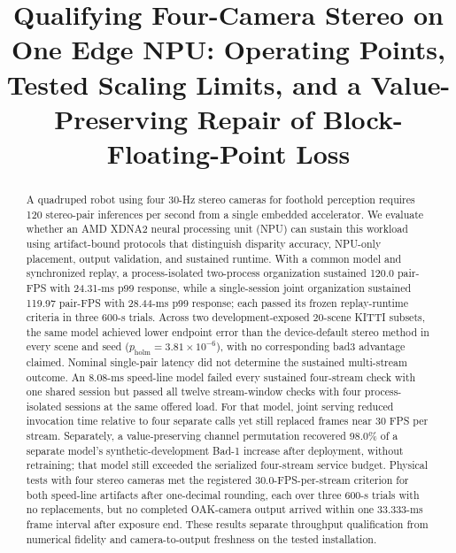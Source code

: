 \documentclass[sigconf,review,anonymous]{acmart}
\begin{document}
\title[Qualifying Four-Camera Stereo on One Edge NPU]{Qualifying Four-Camera Stereo on One Edge NPU: Operating Points, Tested Scaling Limits, and a Value-Preserving Repair of Block-Floating-Point Loss}
\begin{abstract}
A quadruped robot using four 30-Hz stereo cameras for foothold perception requires 120 stereo-pair inferences per second from a single embedded accelerator. We evaluate whether an AMD XDNA2 neural processing unit (NPU) can sustain this workload using artifact-bound protocols that distinguish disparity accuracy, NPU-only placement, output validation, and sustained runtime.
With a common model and synchronized replay, a process-isolated two-process organization sustained 120.0 pair-FPS with 24.31-ms p99 response, while a single-session joint organization sustained 119.97 pair-FPS with 28.44-ms p99 response; each passed its frozen replay-runtime criteria in three 600-s trials. Across two development-exposed 20-scene KITTI subsets, the same model achieved lower endpoint error than the device-default stereo method in every scene and seed ($p_{\mathrm{holm}}=3.81\times10^{-6}$), with no corresponding bad3 advantage claimed.
Nominal single-pair latency did not determine the sustained multi-stream outcome. An 8.08-ms speed-line model failed every sustained four-stream check with one shared session but passed all twelve stream-window checks with four process-isolated sessions at the same offered load. For that model, joint serving reduced invocation time relative to four separate calls yet still replaced frames near 30 FPS per stream.
Separately, a value-preserving channel permutation recovered 98.0\% of a separate model's synthetic-development Bad-1 increase after deployment, without retraining; that model still exceeded the serialized four-stream service budget. Physical tests with four stereo cameras met the registered 30.0-FPS-per-stream criterion for both speed-line artifacts after one-decimal rounding, each over three 600-s trials with no replacements, but no completed OAK-camera output arrived within one 33.333-ms frame interval after exposure end. These results separate throughput qualification from numerical fidelity and camera-to-output freshness on the tested installation.
\end{abstract}

\end{document}
